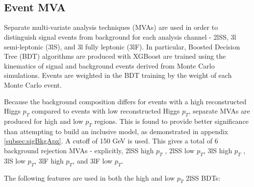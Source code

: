 \begin{figure}[h!]
    \\                             
    \\                         
    \caption{}
    \label{fig:presel3l}                                                                                          
\end{figure}


\subsection{Event MVA}
\label{subsec:sigBkgMVA}

Separate multi-variate analysis techniques (MVAs) are used in order to distinguish signal events from background for each analysis channel - 2lSS, 3l semi-leptonic (3lS), and 3l fully leptonic (3lF). In particular, Boosted Decision Tree (BDT) algorithms are produced with XGBoost \cite{xgboost} are trained using the kinematics of signal and background events derived from Monte Carlo simulations. Events are weighted in the BDT training by the weight of each Monte Carlo event. 

Because the background composition differs for events with a high reconstructed Higgs $p_T$ compared to events with low reconstructed Higgs $p_T$, separate MVAs are produced for high and low $p_T$ regions. This is found to provide better significance than attempting to build an inclusive model, as demonstrated in appendix \ref{subsec:sigBkgApx}. A cutoff of 150 GeV is used. This gives a total of 6 background rejection MVAs - explicitly, 2lSS high $p_T$ , 2lSS low $p_T$, 3lS high $p_T$ , 3lS low $p_T$, 3lF high $p_T$, and 3lF low $p_T$.

The following features are used in both the high and low $p_T$ 2lSS BDTs:

